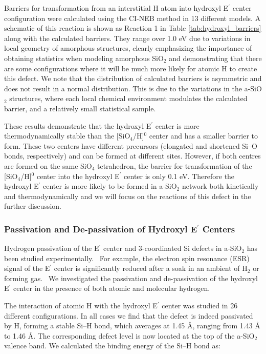 \documentclass[aps,prb,reprint,superscriptaddress,showpacs]{revtex4-1}
\begin{document}
Barriers for transformation from an interstitial H atom into hydroxyl E$^\prime$ center configuration were calculated using the CI-NEB method in 13 different models. A schematic of this reaction is shown as Reaction 1 in Table \ref{tab:hydroxyl_barriers} along with the calculated barriers. They range over 1.0 eV due to variations in local geometry of amorphous structures, clearly emphasizing the importance of obtaining statistics when modeling amorphous SiO$_2$ and demonstrating that there are some configurations where it will be much more likely for atomic H to create this defect. We note that the distribution of calculated barriers is asymmetric and does not result in a normal distribution. This is due to the variations in the a-SiO$_2$ structures, where each local chemical environment modulates the calculated barrier, and a relatively small statistical sample.

These results demonstrate that the hydroxyl E$^\prime$ center is more thermodynamically stable than the [SiO$_4$/H]$^0$ center and has a smaller barrier to form. These two centers have different precursors (elongated and shortened \mbox{Si--O} bonds, respectively) and can be formed at different sites. However, if both centres are formed on the same SiO$_4$ tetrahedron, the barrier for transformation of the [SiO$_4$/H]$^0$ center into the hydroxyl E$^\prime$ center is only 0.1 eV.  Therefore the hydroxyl E$^\prime$ center is more likely to be formed in a-SiO$_2$ network both kinetically and thermodynamically and we will focus on the reactions of this defect in the further discussion. 

\subsubsection{Passivation and De-passivation of Hydroxyl E$^\prime$ Centers}

Hydrogen passivation of the E$^\prime$ center and 3-coordinated Si defects in a-SiO$_2$ has been studied experimentally.~\cite{fleetwood_h_device} For example, the electron spin resonance (ESR) signal of the E$^\prime$ center is significantly reduced after a soak in an ambient of H$_2$ or forming gas.~\cite{h2crack_li} We investigated the passivation and de-passivation of the hydroxyl E$^\prime$ center in the presence of both atomic and molecular hydrogen. 

The interaction of atomic H with the hydroxyl E$^\prime$ center was studied in 26 different configurations. In all cases we find that the defect is indeed passivated by H, forming a stable \mbox{Si--H} bond, which averages at 1.45 {\AA}, ranging from 1.43 {\AA} to 1.46 {\AA}. The corresponding defect level is now located at the top of the a-SiO$_2$ valence band. We calculated the binding energy of the \mbox{Si--H} bond as:
\end{document}
